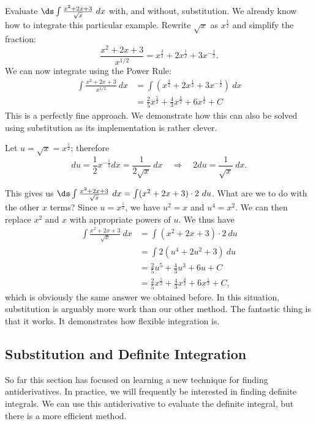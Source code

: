 \begin{example}\label{ex_sub11}
Evaluate $\ds\int \frac{x^2+2x+3}{\sqrt{x}}\ dx$ with, and without, substitution.
\solution
We already know how to integrate this particular example. Rewrite $\sqrt{x}$ as $x^\frac12$ and simplify the fraction:
	\[ \frac{x^2+2x+3}{x^{1/2}} = x^\frac32 + 2x^\frac12 + 3x^{-\frac12}.\]
We can now integrate using the Power Rule:
\begin{align*}
	\int \frac{x^2+2x+3}{x^{1/2}}\ dx &= \int\left(x^\frac32 + 2x^\frac12 + 3x^{-\frac12}\right)\ dx\\
	&=	\frac25x^\frac52 + \frac43x^\frac32 + 6x^\frac12 + C
\end{align*}
This is a perfectly fine approach. We demonstrate how this can also be solved using substitution as its implementation is rather clever.

Let $u = \sqrt{x} = x^\frac12$; therefore 
		\[du = \frac12x^{-\frac12}dx = \frac{1}{2\sqrt{x}}\ dx \quad \Rightarrow \quad 2du = \frac{1}{\sqrt{x}}\ dx.\]
		
This gives us $\ds \int \frac{x^2+2x+3}{\sqrt{x}}\ dx = \int (x^2+2x+3)\cdot2\ du$. What are we to do with the other $x$ terms? Since $u=x^{\frac12}$, we have $u^2=x$ and $u^4=x^2$. We can then replace $x^2$ and $x$ with appropriate powers of $u$. We thus have
\begin{align*}
	\int \frac{x^2+2x+3}{\sqrt{x}}\ dx
	&= \int (x^2+2x+3)\cdot2\ du\\
	&= \int 2(u^4 + 2u^2 + 3)\ du \\
	&= \frac25u^5 + \frac43u^3 + 6u + C \\
	&= \frac25x^\frac52 + \frac43x^\frac32 + 6x^\frac12+C,
\end{align*}
which is obviously the same answer we obtained before. In this situation, substitution is arguably more work than our other method. The fantastic thing is that it works. It demonstrates how flexible integration is.
\end{example}


\subsection{Substitution and Definite Integration}

So far this section has focused on learning a new technique for finding antiderivatives. In practice, we will frequently be interested in finding definite integrals. We can use this antiderivative to evaluate the definite integral, but there is a more efficient method.

